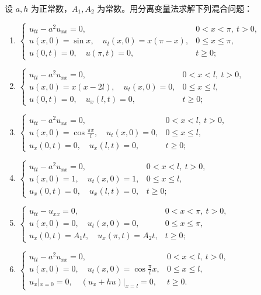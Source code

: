 \documentclass[../../main.tex]{subfiles}%
\begin{document}
\begin{example}
设 $a,h$ 为正常数，$A_1,A_2$ 为常数。用分离变量法求解下列混合问题：
\begin{enumerate}[(1)]
\item $\begin{cases}
u_{tt}-a^2u_{xx}=0, & 0<x<\pi,\ t>0, \\
u(x,0)=\sin x,\quad u_t(x,0)=x(\pi-x), & 0\leqslant x\leqslant\pi, \\
u(0,t)=0,\quad u(\pi,t)=0, & t\geqslant 0;
\end{cases}$
\item $\begin{cases}
u_{tt}-a^2u_{xx}=0, & 0<x<l,\ t>0, \\
u(x,0)=x(x-2l),\quad u_t(x,0)=0, & 0\leqslant x\leqslant l, \\
u(0,t)=0,\quad u_x(l,t)=0, & t\geqslant 0;
\end{cases}$
\item $\begin{cases}
u_{tt}-a^2u_{xx}=0, & 0<x<l,\ t>0, \\
u(x,0)=\cos\frac{\pi x}{l},\quad u_t(x,0)=0, & 0\leqslant x\leqslant l, \\
u_x(0,t)=0,\quad u_x(l,t)=0, & t\geqslant 0;
\end{cases}$
\item $\begin{cases}
u_{tt}-a^2u_{xx}=0, & 0<x<l,\ t>0, \\
u(x,0)=1,\quad u_t(x,0)=1, & 0\leqslant x\leqslant l, \\
u_x(0,t)=0,\quad u_x(l,t)=0, & t\geqslant 0;
\end{cases}$
\item $\begin{cases}
u_{tt}-u_{xx}=0, & 0<x<\pi,\ t>0, \\
u(x,0)=0,\quad u_t(x,0)=0, & 0\leqslant x\leqslant\pi, \\
u_x(0,t)=A_1t,\quad u_x(\pi,t)=A_2t, & t\geqslant 0;
\end{cases}$
\item $\begin{cases}
u_{tt}-a^2u_{xx}=0, & 0<x<l,\ t>0, \\
u(x,0)=0,\quad u_t(x,0)=\cos\frac{\pi}{l}x, & 0\leqslant x\leqslant l, \\
u_x|_{x=0}=0,\quad (u_x+hu)|_{x=l}=0, & t\geqslant 0.
\end{cases}$
\end{enumerate}
\end{example}
\end{document}

